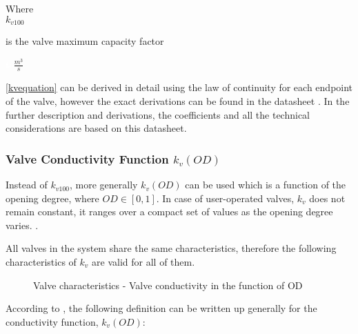 \begin{minipage}[t]{0.20\textwidth}
Where\\
\hspace*{8mm} $k_{v100}$ 
\end{minipage}
\begin{minipage}[t]{0.68\textwidth}
\vspace*{2mm}
is the valve maximum capacity factor  
 \end{minipage}
\begin{minipage}[t]{0.10\textwidth}
\vspace*{2mm}
\textcolor{White}{te}$\unit{\frac{m^{3}}{s}}$
\end{minipage}

\eqref{kvequation} can be derived in detail using the law of continuity for each endpoint of the valve, however the exact derivations can be found in the datasheet \cite{kvvalve}. In the further description and derivations, the coefficients and all the technical considerations are based on this datasheet.  

\subsubsection{Valve Conductivity Function \texorpdfstring{$k_v(OD)$}{}}
\label{OD}

Instead of $k_{v100}$, more generally $k_v(OD)$ can be used which is a function of the opening degree, where $OD \in  [0,1]$. In case of user-operated valves, $k_{v}$ does not remain constant, it ranges over a compact set of values as the opening degree varies. \cite{Kallesoe2009}.

All valves in the system share the same characteristics, therefore the following characteristics of $k_{v}$ are valid for all of them. 


\begin{figure}[H]
\centering
 
\caption{Valve characteristics - Valve conductivity in the function of OD}
\label{valve_conductivity}
\end{figure}

According to \cite{keller}, the following definition can be written up generally for the conductivity function, $k_v(OD)$:



